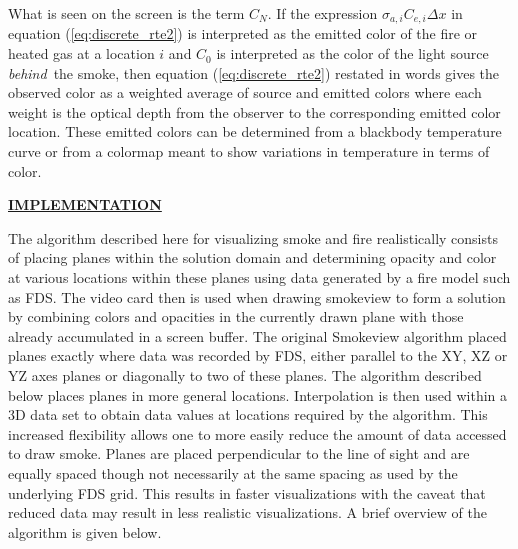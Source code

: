 \documentclass[11pt]{article}
\newcommand{\ssection}[1]{\underline{\bf #1}}
\begin{document}
\noindent What is seen on the screen is the term $C_N$.
If the expression $\sigma_{a,i}C_{e,i}\Delta x$ in equation (\ref{eq:discrete_rte2}) is interpreted as
the emitted color of the fire or
heated gas at a location $i$ and $C_0$ is interpreted as the color
of the light source {\em behind}\ the smoke, then equation
(\ref{eq:discrete_rte2}) restated in words gives the observed color
as a weighted average of source and emitted
colors where each weight is the optical depth from the observer to
the corresponding emitted color location.  These emitted colors can be
determined from a blackbody temperature curve or from a colormap
meant to show variations in temperature in terms of color.


\ssection{IMPLEMENTATION}

The algorithm described here for visualizing smoke and fire realistically consists of placing
planes within the solution domain and determining opacity and color
at various locations within these planes
using data generated by a fire model such as FDS.  The video card then is
used when drawing smokeview to form a solution by combining colors and opacities in the currently drawn
plane with those already accumulated in a screen buffer.
The original Smokeview algorithm placed planes exactly where data was recorded by FDS,
either parallel to the XY, XZ or YZ axes planes or diagonally to two of these planes.
The algorithm described below places planes in more general locations. Interpolation is then used
within a 3D data set to obtain data values at locations required by the algorithm.
This increased flexibility
allows one to more easily reduce the amount of data accessed to draw smoke.
Planes are placed perpendicular to the line of sight and are equally spaced though not
necessarily at the same spacing as used by the underlying FDS grid.
This results in faster visualizations with the caveat that reduced data may result
in less realistic visualizations.  A brief overview of the algorithm is given below.
\end{document}

